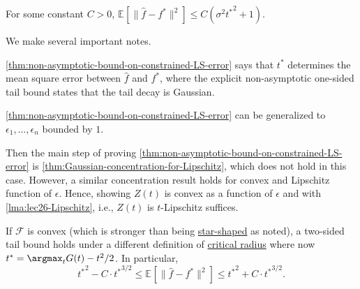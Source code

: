 \begin{remark}
	For some constant \(C > 0\), \(\mathbb{E}_{}[ \lVert \hat{f} - f^{\ast} \rVert ^2 ] \leq C (\sigma ^2 {t^{\ast} }^2 + 1)\).
\end{remark}

We make several important notes.

\begin{note}
	\autoref{thm:non-asymptotic-bound-on-constrained-LS-error} says that \(t^{\ast} \) determines the mean square error between \(\hat{f} \) and \(f^{\ast} \), where the explicit non-asymptotic one-sided tail bound states that the tail decay is Gaussian.
\end{note}

\begin{note}
	\autoref{thm:non-asymptotic-bound-on-constrained-LS-error} can be generalized to \(\epsilon _1, \dots , \epsilon _n \) bounded by \(1\).
\end{note}
\begin{explanation}
	Then the main step of proving \autoref{thm:non-asymptotic-bound-on-constrained-LS-error} is \autoref{thm:Gaussian-concentration-for-Lipschitz}, which does not hold in this case. However, a similar concentration result holds for convex and Lipschitz function of \(\epsilon \). Hence, showing \(Z(t)\) is convex as a function of \(\epsilon \) and with \autoref{lma:lec26-Lipschitz}, i.e., \(Z(t)\) is \(t\)-Lipschitz suffices.
\end{explanation}

\begin{note}
	If \(\mathscr{F} \) is convex (which is stronger than being \hyperref[def:star-shaped]{star-shaped} as noted), a two-sided tail bound holds under a different definition of \hyperref[def:critical-radius]{critical radius} where now \(t^{\ast} = \argmax_{t} G(t) - t^2 / 2\). In particular,
	\[
		{t^{\ast} }^2 - C\cdot {t^{\ast} }^{3 / 2}
		\leq \mathbb{E}_{}\left[ \lVert \hat{f} - f^{\ast} \rVert ^2 \right]
		\leq {t^{\ast} }^2 + C\cdot {t^{\ast} }^{3 / 2}.
	\]
\end{note}